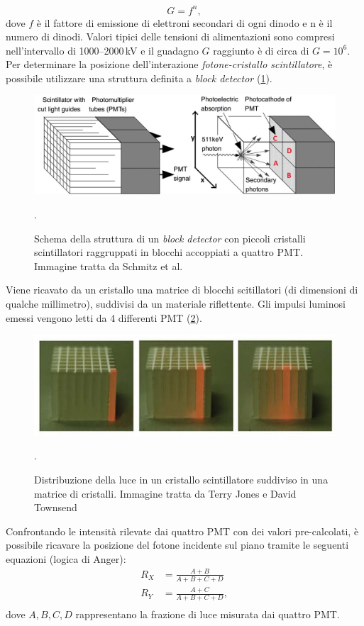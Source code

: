 \begin{equation}
	G = f^n,
\end{equation}
dove $f$ è il fattore di emissione di elettroni secondari di ogni dinodo e n è il numero di dinodi. Valori tipici delle tensioni di alimentazioni sono  compresi nell'intervallo di \numrange[range-phrase=--]{1000}{2000}\,\unit{\kilo\volt} e il guadagno $G$ raggiunto è di circa di $G=10^6$. Per determinare la posizione dell'interazione \textit{fotone-cristallo scintillatore}, è possibile utilizzare una struttura definita a \textit{block detector} (\Fig\ref{fig:block_detector}).
\begin{figure}[tbh]
	\centering
	\includegraphics[width=0.8\linewidth]{./ImageFiles/block_detector.jpg}
	\caption{Schema della struttura di un \textit{block detector} con piccoli cristalli scintillatori raggruppati in blocchi accoppiati a quattro PMT. Immagine tratta da Schmitz et al. \cite{Schmitz2013ThePO}}. 
	\label{fig:block_detector}
\end{figure}
Viene ricavato da un cristallo una matrice di blocchi scitillatori (di dimensioni di qualche millimetro), suddivisi da un materiale riflettente. Gli impulsi luminosi emessi vengono letti da 4 differenti PMT (\Fig\ref{fig:block_detector_cube}).
\begin{figure}[tbh]
	\centering
	\includegraphics[width=0.6\linewidth]{./ImageFiles/block_detector_lightoncube.jpg}
	\caption{Distribuzione della luce in un cristallo scintillatore suddiviso in una matrice di cristalli. Immagine tratta da Terry Jones e David Townsend \cite{Jones2017}}. 
	\label{fig:block_detector_cube}
\end{figure}
Confrontando le intensità rilevate dai quattro PMT con dei valori pre-calcolati, è possibile ricavare la posizione del fotone incidente sul piano tramite le seguenti equazioni \cite{RamseyDerek} (logica di Anger):
\begin{equation}
	\begin{split}
		R_X&=\frac{A+B}{A+B+C+D} \\
		R_Y&=\frac{A+C}{A+B+C+D}, \\
	\end{split}
\end{equation}
dove $A,B,C,D$ rappresentano la frazione di luce misurata dai quattro PMT.


